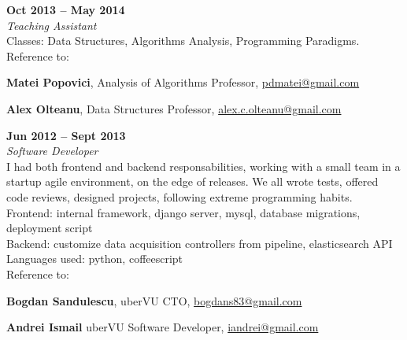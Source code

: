 \documentclass[margin,line]{resume}
\begin{document}
\begin{resume}
		\hfill \textbf{Oct 2013 -- May 2014}\vspace{1mm}\\
	{\fontsize{4mm}{0em}\selectfont
		\textsl{Teaching Assistant}\vspace{1.5mm}\\
	}
	Classes: Data Structures, Algorithms Analysis, Programming Paradigms.\vspace{1.2mm}\\
	Reference to:
	\begin{list2}
		\item \textbf{Matei Popovici}, Analysis of Algorithms Professor, \href{mailto:pdmatei@gmail.com}{pdmatei@gmail.com}
		\item \textbf{Alex Olteanu}, Data Structures Professor, \href{mailto:alex.c.olteanu@gmail.com}{alex.c.olteanu@gmail.com}
	\end{list2}

		\hfill \textbf{Jun 2012 -- Sept 2013}\vspace{1.2mm}\\
	{\fontsize{4mm}{0em}\selectfont
		\textsl{Software Developer}\vspace{1.5mm}\\
	}
	I had both frontend and backend responsabilities, working with a small team in a startup agile environment, on the edge of releases. We all wrote tests, offered code reviews, designed projects, following extreme programming habits.\vspace{1.2mm}\\
	Frontend: internal framework, django server, mysql, database migrations, deployment script\vspace{1.2mm}\\
	Backend: customize data acquisition controllers from pipeline, elasticsearch API\vspace{1.2mm}\\
	Languages used: python, coffeescript\vspace{1.2mm}\\
	Reference to:
	\begin{list2}
		\item \textbf{Bogdan Sandulescu}, uberVU CTO, \href{mailto:bogdans83@gmail.com}{bogdans83@gmail.com}
		\item \textbf{Andrei Ismail} uberVU Software Developer, \href{mailto:iandrei@gmail.com}{iandrei@gmail.com}
	\end{list2}


\end{resume}
\end{document}

